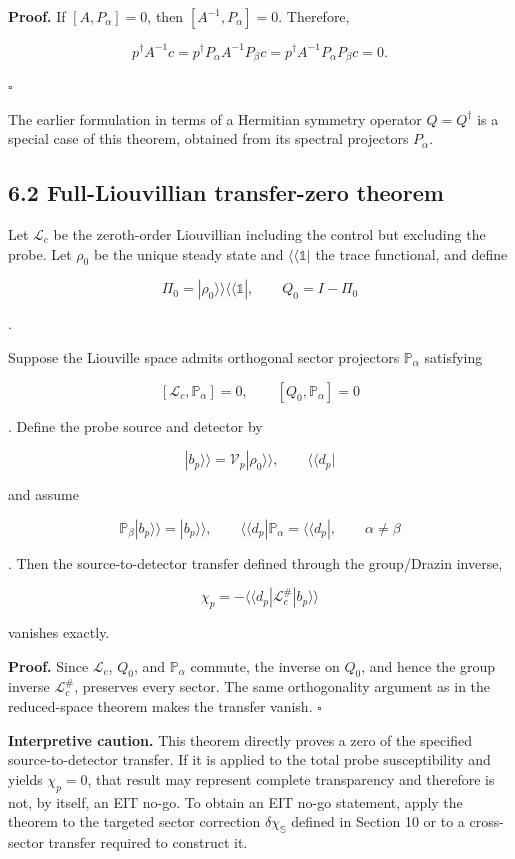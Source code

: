 \documentclass[
  10pt,
  a4paper,
]{article}
\begin{document}
\textbf{Proof.} If \([A,P_\alpha]=0\), then \([A^{-1},P_\alpha]=0\).
Therefore,

\[
p^\dagger A^{-1}c
=p^\dagger P_\alpha A^{-1}P_\beta c
=p^\dagger A^{-1}P_\alpha P_\beta c=0.
\]

\(\square\)

The earlier formulation in terms of a Hermitian symmetry operator
\(Q=Q^\dagger\) is a special case of this theorem, obtained from its
spectral projectors \(P_\alpha\).

\subsection{6.2 Full-Liouvillian transfer-zero
theorem}\label{full-liouvillian-transfer-zero-theorem}

Let \(\mathcal L_c\) be the zeroth-order Liouvillian including the
control but excluding the probe. Let \(\rho_0\) be the unique steady
state and \(\langle\!\langle\mathbb 1|\) the trace functional, and
define

\[
\Pi_0=|\rho_0\rangle\!\rangle
\langle\!\langle\mathbb 1|,
\qquad
Q_0=I-\Pi_0
\]

.

Suppose the Liouville space admits orthogonal sector projectors
\(\mathbb P_\alpha\) satisfying

\[
[\mathcal L_c,\mathbb P_\alpha]=0,
\qquad
[Q_0,\mathbb P_\alpha]=0
\]

. Define the probe source and detector by

\[
|b_p\rangle\!\rangle
=\mathcal V_p|\rho_0\rangle\!\rangle,
\qquad
\langle\!\langle d_p|
\]

and assume

\[
\mathbb P_\beta|b_p\rangle\!\rangle=|b_p\rangle\!\rangle,
\qquad
\langle\!\langle d_p|\mathbb P_\alpha
=\langle\!\langle d_p|,
\qquad
\alpha\neq\beta
\]

. Then the source-to-detector transfer defined through the group/Drazin
inverse,

\[
\chi_p
=-\langle\!\langle d_p|
\mathcal L_c^\#
|b_p\rangle\!\rangle
\]

vanishes exactly.

\textbf{Proof.} Since \(\mathcal L_c\), \(Q_0\), and
\(\mathbb P_\alpha\) commute, the inverse on \(Q_0\), and hence the
group inverse \(\mathcal L_c^\#\), preserves every sector. The same
orthogonality argument as in the reduced-space theorem makes the
transfer vanish. \(\square\)

\textbf{Interpretive caution.} This theorem directly proves a zero of
the specified source-to-detector transfer. If it is applied to the total
probe susceptibility and yields \(\chi_p=0\), that result may represent
complete transparency and therefore is not, by itself, an EIT no-go. To
obtain an EIT no-go statement, apply the theorem to the targeted sector
correction \(\delta\chi_{\mathbb S}\) defined in Section 10 or to a
cross-sector transfer required to construct it.
\end{document}
